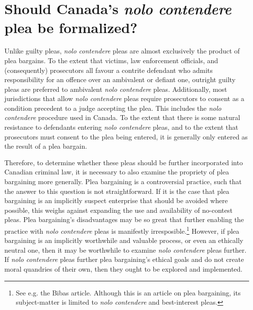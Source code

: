 \chapter{Should Canada's \textit{nolo contendere} plea be formalized?}

Unlike guilty pleas, \textit{nolo contendere} pleas are almost exclusively the product of plea bargains. To the extent that victims, law enforcement officials, and (consequently) prosecutors all favour a contrite defendant who admits responsibility for an offence over an ambivalent or defiant one, outright guilty pleas are preferred to ambivalent \textit{nolo contendere} pleas. Additionally, most jurisdictions that allow \textit{nolo contendere} pleas require prosecutors to consent as a condition precedent to a judge accepting the plea. This includes the \textit{nolo contendere} procedure used in Canada. To the extent that there is some natural resistance to defendants entering \textit{nolo contendere} pleas, and to the extent that prosecutors must consent to the plea being entered, it is generally only entered as the result of a plea bargain.

Therefore, to determine whether these pleas should be further incorporated into Canadian criminal law, it is necessary to also examine the propriety of plea bargaining more generally. Plea bargaining is a controversial practice, such that the answer to this question is not straightforward. If it is the case that plea bargaining is an implicitly suspect enterprise that should be avoided where possible, this weighs against expanding the use and availability of no-contest pleas. Plea bargaining's disadvantages may be so great that further enabling the practice with \textit{nolo contendere} pleas is manifestly irresposible.\footnote{See e.g. the Bibas article. Although this is an article on plea bargaining, its subject-matter is limited to \textit{nolo contendere} and best-interest pleas.} However, if plea bargaining is an implicitly worthwhile and valuable process, or even an ethically neutral one, then it may be worthwhile to examine \textit{nolo contendere} pleas further. If \textit{nolo contendere} pleas further plea bargaining's ethical goals and do not create moral quandries of their own, then they ought to be explored and implemented.

